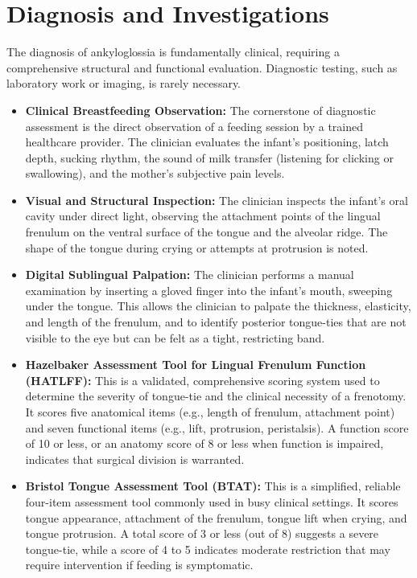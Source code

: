 \section*{Diagnosis and Investigations}
The diagnosis of ankyloglossia is fundamentally clinical, requiring a comprehensive structural and functional evaluation. Diagnostic testing, such as laboratory work or imaging, is rarely necessary.
\begin{itemize}
  \item \textbf{Clinical Breastfeeding Observation:} The cornerstone of diagnostic assessment is the direct observation of a feeding session by a trained healthcare provider. The clinician evaluates the infant's positioning, latch depth, sucking rhythm, the sound of milk transfer (listening for clicking or swallowing), and the mother's subjective pain levels.
  \item \textbf{Visual and Structural Inspection:} The clinician inspects the infant's oral cavity under direct light, observing the attachment points of the lingual frenulum on the ventral surface of the tongue and the alveolar ridge. The shape of the tongue during crying or attempts at protrusion is noted.
  \item \textbf{Digital Sublingual Palpation:} The clinician performs a manual examination by inserting a gloved finger into the infant's mouth, sweeping under the tongue. This allows the clinician to palpate the thickness, elasticity, and length of the frenulum, and to identify posterior tongue-ties that are not visible to the eye but can be felt as a tight, restricting band.
  \item \textbf{Hazelbaker Assessment Tool for Lingual Frenulum Function (HATLFF):} This is a validated, comprehensive scoring system used to determine the severity of tongue-tie and the clinical necessity of a frenotomy. It scores five anatomical items (e.g., length of frenulum, attachment point) and seven functional items (e.g., lift, protrusion, peristalsis). A function score of 10 or less, or an anatomy score of 8 or less when function is impaired, indicates that surgical division is warranted.
  \item \textbf{Bristol Tongue Assessment Tool (BTAT):} This is a simplified, reliable four-item assessment tool commonly used in busy clinical settings. It scores tongue appearance, attachment of the frenulum, tongue lift when crying, and tongue protrusion. A total score of 3 or less (out of 8) suggests a severe tongue-tie, while a score of 4 to 5 indicates moderate restriction that may require intervention if feeding is symptomatic.
\end{itemize}

